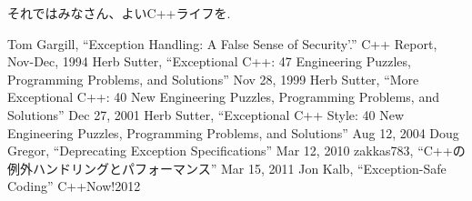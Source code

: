 \documentclass[a4j,11pt,openright]{jsbook}
\begin{document}
それではみなさん、よいC++ライフを.

\newpage
\begin{thebibliography}{9}
   Tom Gargill, ``Exception Handling: A False Sense of Security'.'' C++ Report, Nov-Dec, 1994
   Herb Sutter, ``Exceptional C++: 47 Engineering Puzzles, Programming Problems, and Solutions'' Nov 28, 1999
   Herb Sutter, ``More Exceptional C++: 40 New Engineering Puzzles, Programming Problems, and Solutions'' Dec 27, 2001
   Herb Sutter, ``Exceptional C++ Style: 40 New Engineering Puzzles, Programming Problems, and Solutions'' Aug 12, 2004
   Doug Gregor, ``Deprecating Exception Specifications'' Mar 12, 2010
   zakkas783, ``C++の例外ハンドリングとパフォーマンス'' Mar 15, 2011
   Jon Kalb, ``Exception-Safe Coding'' C++Now!2012
\end{thebibliography}
\end{document}
